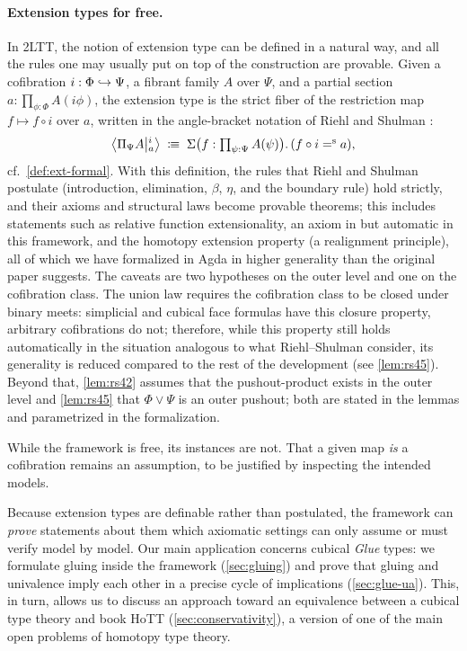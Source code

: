 \paragraph{Extension types for free.}
In 2LTT, the notion of extension type can be defined in a natural way, and all the rules one may usually put on top of the construction are provable.
Given a cofibration $i:\Phi\cofib\Psi$, a fibrant family $A$ over $\Psi$, and
a partial section $a:\prod_{\phi:\Phi}A(i\phi)$, the extension type is the
strict fiber of the restriction map $f \mapsto f \circ i$ over $a$, written
in the angle-bracket notation of Riehl and Shulman \citep{RS2017}:
\[
	\Ext{i}{\Pi_\Psi A}{a}\;\colonequiv\;
	\Sigma\bigl(f:\textstyle\prod_{\psi:\Psi}A(\psi)\bigr).\,(f\circ i\seq a),
\]
cf.\ \cref{def:ext-formal}. With this definition, the rules that Riehl and
Shulman postulate (introduction, elimination, $\beta$, $\eta$, and
the boundary rule) hold strictly, and their axioms and structural laws become provable theorems;
this includes statements such as relative function extensionality, an axiom in \citet{RS2017} but automatic in this
framework,
and the homotopy extension property (a realignment principle), all of which we have formalized in Agda in higher generality than the original paper suggests.
The caveats are two hypotheses on the outer level and one on the cofibration class.
The union law requires the cofibration class to be closed under binary meets: simplicial and cubical face formulas
have this closure property, arbitrary cofibrations do not; therefore, while this property still holds automatically in the situation analogous to what Riehl--Shulman consider, its generality is reduced compared to the rest of the development (see \cref{lem:rs45}).
Beyond that, \cref{lem:rs42} assumes that the pushout-product exists in the outer level and \cref{lem:rs45} that $\Phi\vee\Psi$ is an outer pushout; both are stated in the lemmas and parametrized in the formalization.

While the framework is free, its instances are not. That a given map \emph{is} a
cofibration remains an assumption, to be justified by inspecting the intended
models. 

Because extension types are definable rather than postulated, the framework
can \emph{prove} statements about them which axiomatic settings can only
assume or must verify model by model. Our main application concerns cubical
\emph{Glue} types: we formulate gluing inside the framework
(\cref{sec:gluing}) and prove that gluing and univalence imply each other in
a precise cycle of implications (\cref{sec:glue-ua}).
This, in turn, allows us to discuss
an approach toward an equivalence between a cubical type theory and book HoTT
(\cref{sec:conservativity}), a version of one of the main open problems of
homotopy type theory.

